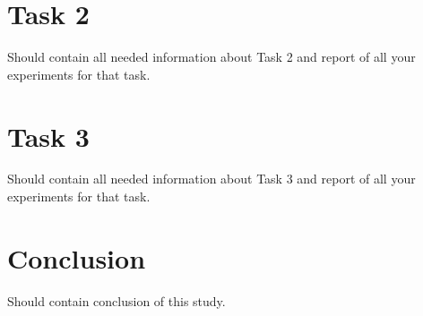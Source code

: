 \documentclass{article}
\begin{document}
\section{Task 2}
Should contain all needed information about Task 2 and report of all your experiments for that task.

\section{Task 3}
Should contain all needed information about Task 3 and report of all your experiments for that task.

\section{Conclusion}
Should contain conclusion of this study.

%
%
%
%
\end{document}
